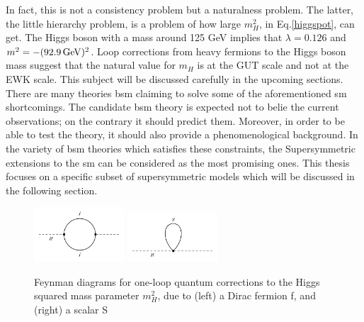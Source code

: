 In fact, this is not a consistency problem but a naturalness problem. The latter, the little hierarchy problem, is a problem of how large $m_{H}^2$, in Eq.\ref{higgspot}, can get. The Higgs boson with a mass around 125 GeV implies that $\lambda=0.126$ and $m^2=-(92.9\,{\rm GeV})^2$. 
Loop corrections from heavy fermions to the Higgs boson mass suggest that the natural value for $m_H$ is at the GUT scale and not at the EWK scale.
This subject will be discussed carefully in the upcoming sections.\\
There are many theories \acrfull{bsm} claiming to solve some of the aforementioned \acrshort{sm} shortcomings. The candidate \acrshort{bsm} theory is expected not to belie the current observations; on the contrary it should predict them. Moreover, in order to be able to test the theory, it should also provide a phenomenological background. 
In the variety of \acrshort{bsm} theories which satisfies these constraints, the Supersymmetric extensions to the \acrshort{sm} can be considered as the most promising ones.
This thesis focuses on a specific subset of supersymmetric models which will be discussed in the following section.
\begin{figure}[!h]
\centering
  \includegraphics[width=0.3\textwidth]{Plots/feyndiagrams/susy_loop1.pdf}
    \includegraphics[width=0.3\textwidth]{Plots/feyndiagrams/susy_loop2.pdf}
  \caption[Feynman diagrams for one-loop quantum corrections on the Higgs squared mass parameter]{\label{fig:higgsloop} Feynman diagrams for one-loop quantum corrections to the Higgs squared mass parameter $m_{H}^2$, due to (left) a Dirac fermion f, and (right) a scalar S ~\cite{SUSY1}}
\end{figure}

